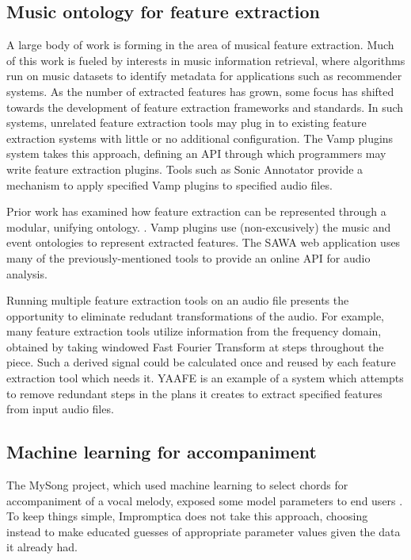 \documentclass[11pt,conference,letterpaper]{IEEEtran}
\begin{document}
\subsection{Music ontology for feature extraction}

A large body of work is forming in the area of musical feature extraction. Much of this work is fueled by interests in music information retrieval, where algorithms run on music datasets to identify metadata for applications such as recommender systems. As the number of extracted features has grown, some focus has shifted towards the development of feature extraction frameworks and standards. In such systems, unrelated feature extraction tools may plug in to existing feature extraction systems with little or no additional configuration. The Vamp plugins system takes this approach, defining an API through which programmers may write feature extraction plugins. Tools such as Sonic Annotator provide a mechanism to apply specified Vamp plugins to specified audio files.

Prior work has examined how feature extraction can be represented through a modular, unifying ontology. \cite{raimond2008web}. Vamp plugins use (non-excusively) the music \cite{raimond2007music} and event \cite{raimond2007event} ontologies to represent extracted features. The SAWA web application \cite{fazekas2009reusable} uses many of the previously-mentioned tools to provide an online API for audio analysis.


Running multiple feature extraction tools on an audio file presents the opportunity to eliminate redudant transformations of the audio. For example, many feature extraction tools utilize information from the frequency domain, obtained by taking windowed Fast Fourier Transform at steps throughout the piece. Such a derived signal could be calculated once and reused by each feature extraction tool which needs it. YAAFE \cite{mathieu2010yaafe} is an example of a system which attempts to remove redundant steps in the plans it creates to extract specified features from input audio files.

\subsection{Machine learning for accompaniment}

The MySong project, which used machine learning to select chords for accompaniment of a vocal melody, exposed some model parameters to end users \cite{morris2008exposing}. To keep things simple, Impromptica does not take this approach, choosing instead to make educated guesses of appropriate parameter values given the data it already had.
\end{document}
